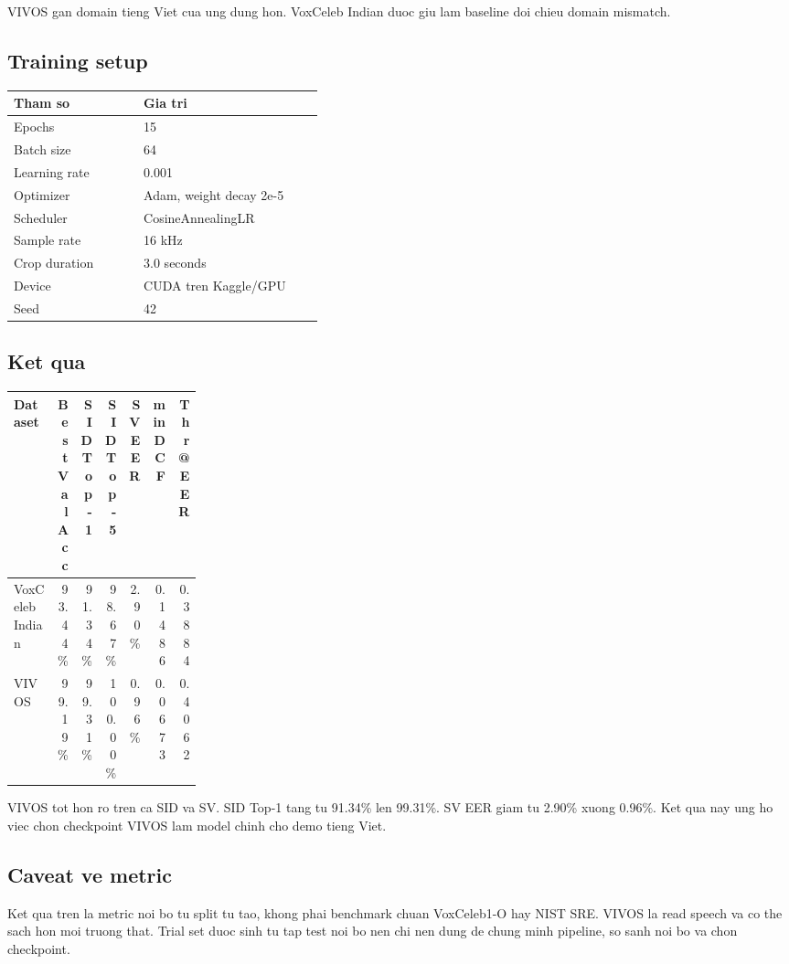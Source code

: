 \documentclass[12pt,a4paper]{article}
\begin{document}
VIVOS gan domain tieng Viet cua ung dung hon. VoxCeleb Indian duoc giu lam
baseline doi chieu domain mismatch.

\subsection{Training setup}

\begin{longtable}{p{0.36\linewidth}p{0.5\linewidth}}
\toprule
\textbf{Tham so} & \textbf{Gia tri} \\
\midrule
\endhead
Epochs & 15 \\
Batch size & 64 \\
Learning rate & 0.001 \\
Optimizer & Adam, weight decay 2e-5 \\
Scheduler & CosineAnnealingLR \\
Sample rate & 16 kHz \\
Crop duration & 3.0 seconds \\
Device & CUDA tren Kaggle/GPU \\
Seed & 42 \\
\bottomrule
\end{longtable}

\subsection{Ket qua}

\begin{longtable}{p{0.24\linewidth}r r r r r r}
\toprule
\textbf{Dataset} & \textbf{Best Val Acc} & \textbf{SID Top-1} & \textbf{SID Top-5} & \textbf{SV EER} & \textbf{minDCF} & \textbf{Thr@EER} \\
\midrule
\endhead
VoxCeleb Indian & 93.44\% & 91.34\% & 98.67\% & 2.90\% & 0.1486 & 0.3884 \\
VIVOS & 99.19\% & 99.31\% & 100.00\% & 0.96\% & 0.0673 & 0.4062 \\
\bottomrule
\end{longtable}

VIVOS tot hon ro tren ca SID va SV. SID Top-1 tang tu 91.34\% len 99.31\%.
SV EER giam tu 2.90\% xuong 0.96\%. Ket qua nay ung ho viec chon checkpoint
VIVOS lam model chinh cho demo tieng Viet.

\subsection{Caveat ve metric}

Ket qua tren la metric noi bo tu split tu tao, khong phai benchmark chuan
VoxCeleb1-O hay NIST SRE. VIVOS la read speech va co the sach hon moi truong
that. Trial set duoc sinh tu tap test noi bo nen chi nen dung de chung minh
pipeline, so sanh noi bo va chon checkpoint.
\end{document}
